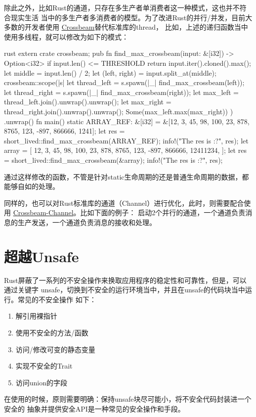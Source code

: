 除此之外，比如Rust的通道，只存在多生产者单消费者这一种模式，这也并不符合现实生活
当中的多生产者多消费者的模型。为了改进Rust的并行/并发，目前大多数的开发者使用
\href{https://github.com/crossbeam-rs/crossbeam}{Crossbeam}替代标准库的thread，
比如，上述的递归函数当中使用多线程，就可以修改为如下的模式：
\begin{code-block}{rust}
extern crate crossbeam;
pub fn find_max_crossbeam(input: &[i32]) -> Option<i32> {
    if input.len() <= THRESHOLD {
        return input.iter().cloned().max();
    }
    let middle = input.len() / 2;
    let (left, right) = input.split_at(middle);
    crossbeam::scope(|s| {
        let thread_left = s.spawn(|_| find_max_crossbeam(left));
        let thread_right = s.spawn(|_| find_max_crossbeam(right));
        let max_left = thread_left.join().unwrap().unwrap();
        let max_right = thread_right.join().unwrap().unwrap();
        Some(max_left.max(max_right))
    })
    .unwrap()
}
fn main() {
    static ARRAY_REF: &[i32] = &[12, 3, 45, 98, 100, 23, 878, 8765, 123, -897, 866666, 1241];
    let res = short_lived::find_max_crossbeam(ARRAY_REF);
    info!("The res is {:?}", res);
    let array = [
        12, 3, 45, 98, 100, 23, 878, 8765, 123, -897, 866666, 12411234,
    ];
    let res = short_lived::find_max_crossbeam(&array);
    info!("The res is {:?}", res);
}
\end{code-block}
通过这样修改的函数，不管是针对static生命周期的还是普通生命周期的数据，都能够自如的处理。

同样的，也可以对Rust标准库的通道（Channel）进行优化，此时，则需要配合使用
\href{https://github.com/crossbeam-rs/crossbeam}{Crossbeam-Channel}。比如下面的例子：
启动2个并行的通道，一个通道负责消息的生产发送，一个通道负责消息的接收和处理。

\section{超越Unsafe}
Rust屏蔽了一系列的不安全操作来换取应用程序的稳定性和可靠性，但是，可以通过关键字
unsafe，切换到不安全的运行环境当中，并且在unsafe的代码块当中运行。常见的不安全操作
如下：
\begin{enumerate}
  \item 解引用裸指针
  \item 使用不安全的方法/函数
  \item 访问/修改可变的静态变量
  \item 实现不安全的Trait
  \item 访问union的字段
\end{enumerate}
在使用的时候，原则需要明确：保持unsafe块尽可能小，将不安全代码封装进一个安全的
抽象并提供安全API是一种常见的安全操作和手段。

